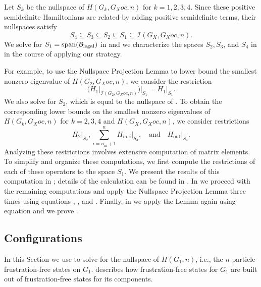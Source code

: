 \documentclass[../thesis-main/thesis-main]{subfiles}
\begin{document}
Let $S_{k}$ be the nullspace of $H(G_{k},G_Xoc,n)$ for $k=1,2,3,4$. Since these positive semidefinite Hamiltonians are related by adding positive semidefinite terms, their nullspaces satisfy 
\begin{equation}
S_{4}\subseteq S_{3}\subseteq S_{2}\subseteq S_{1}\subseteq\mathcal{\mathcal{I}}\left(G_X,G_Xoc,n\right).
\end{equation}
We solve for $S_1=\operatorname{span}(\mathcal{B}_{\text{legal}})$ in  and we characterize the spaces $S_2,S_3$, and $S_4$ in  in the course of applying our strategy. 

For example, to use the Nullspace Projection Lemma to lower bound the smallest nonzero eigenvalue of $H(G_{2},G_Xoc,n)$, we consider the restriction 
\begin{equation}
  \Big(H_{1}\big|_{\mathcal{I}(G_{2},G_Xoc,n)}\Big)\Big|_{S_{1}}
  =H_{1}\big|_{S_{1}}.\label{eq:H1_restriction}
\end{equation}
We also solve for $S_2$, which is equal to the nullspace of . To obtain the corresponding lower bounds on the smallest nonzero eigenvalues of $H(G_{k},G_Xoc,n)$ for $k=2,3,4$ and $H(G_X,G_Xoc,n)$, we consider restrictions 
\begin{equation}
  H_{2}\big|_{S_{2}},
  \sum_{i=n_{\text{in}}+1}^{n}H_{\text{in},i}\big|_{S_{3}},\quad\text{and}\quad
  H_{\text{out}}\big|_{S_{4}}.
\end{equation}
Analyzing these restrictions involves extensive computation of matrix elements. To simplify and organize these computations, we first compute the restrictions of each of these operators to the space $S_{1}$. We present the results of this computation in ; details of the calculation can be found in . In  we proceed with the remaining computations and apply the Nullspace Projection Lemma three times using equations , , and . Finally, in  we apply the Lemma again using equation  and we prove .



\subsection{Configurations}

In this Section we use  to solve for the nullspace of $H(G_{1},n)$, i.e., the $n$-particle frustration-free states on $G_{1}$.  describes how frustration-free states for $G_1$ are built out of frustration-free states for its components.
\end{document}
